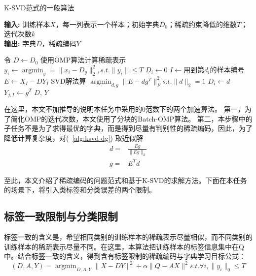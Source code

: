     \begin{algorithm}[b]
    \caption{K-SVD范式的一般算法\cite{aharon2006rm}} %
    \hspace*{0.02in} {\bf 输入:} %
    训练样本$X $，每一列表示一个样本；初始字典$D_0$；稀疏约束降低的维数$T$；迭代次数$k$ \\
    \hspace*{0.02in} {\bf 输出:} %
    字典$D$，稀疏编码$Y$
    \begin{algorithmic}[1]
    \State 令 $D \leftarrow D_0$
            \State 使用OMP算法计算稀疏表示 $y_i \leftarrow \mathop{\arg\min}_{y} = \|x_i - D_y\| ^2_2, s.t. \|y_i\| \le T $  \label{alg:line:omp}
        \EndFor
            \State $D_i \leftarrow 0$
            \State $I \leftarrow 用到第d_i的样本编号$
            \State $E \leftarrow X_I - D Y_I$
            \State SVD解法算 $\mathop{\arg\min}_{d, g}\|E - dg^T\|^2 _F s.t. \|d\|_2 = 1 $\label{alg:line:appro}
            \State $D_i \leftarrow d$
            \State $Y_{j, I} \leftarrow g^T$
        \EndFor
    \EndFor
    \State \Return $D$, $Y$
    \end{algorithmic}
    \label{alg:ksvdAlg}
    \end {algorithm}

    在这里，本文不加推导的说明本任务中采用的0范数下的两个加速算法。
    第一，为了简化OMP的迭代次数，本文使用了分块的Batch-OMP算法\cite{rubinstein2008efficient}。
    第二，本步骤中的子任务不是为了求得最优的字典，而是得到尽量有判别性的稀疏编码，因此，为了降低计算复杂度，对(~\ref{alg:ksvd-dg}) 取近似解\cite{rubinstein2008efficient}
    \begin{equation}
    \begin{split}
    d = & \frac{Eg}{\|Eg\|_2} \\
    g = & E^T d
    \end{split}
    \end{equation}

    至此，本文介绍了稀疏编码的问题范式和基于K-SVD的求解方法。下面在本任务的场景下，将引入类标签和分类误差的两个限制。

    

    \subsection{标签一致限制与分类限制}
    \label{sec:ksvd-constraint}
    标签一致的含义是，希望相同类别的训练样本的稀疏表示尽量相似，而不同类别的训练样本的稀疏表示尽量不同。在这里，本算法把训练样本的标签信息集中在Q中。结合标签一致的含义，得到含有标签限制的稀疏编码与字典学习目标公式\cite{jiang2013label}：
    \begin{equation}
    \label{alg:lc-ksvd1}
    (D, A, Y) = \mathop{\arg \min} _{D, A, Y} \|X - DY\| ^ 2 + \alpha\|Q - AX\|^2 s.t. \forall i, \|y_i\|_0 \le T
    \end{equation}

